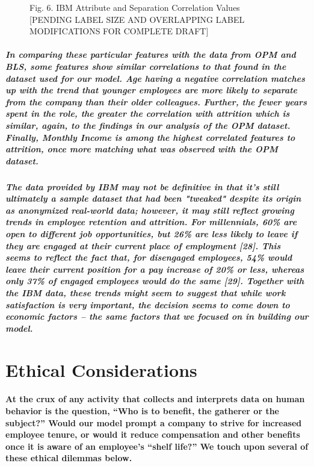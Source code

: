 \documentclass{article}
\begin{document}
\begin{figure}
\caption{Fig. 6. IBM Attribute and Separation Correlation Values [PENDING LABEL SIZE AND OVERLAPPING LABEL MODIFICATIONS FOR COMPLETE DRAFT]}
\end{figure}
 
\subparagraph{In comparing these particular features with the data from OPM and BLS, some features show similar correlations to that found in the dataset used for our model. Age having a negative correlation matches up with the trend that younger employees are more likely to separate from the company than their older colleagues. Further, the fewer years spent in the role, the greater the correlation with attrition which is similar, again, to the findings in our analysis of the OPM dataset. Finally, Monthly Income is among the highest correlated features to attrition, once more matching what was observed with the OPM dataset.}
 
\subparagraph{The data provided by IBM may not be definitive in that it's still ultimately a sample dataset that had been "tweaked" despite its origin as anonymized real-world data; however, it may still reflect growing trends in employee retention and attrition. For millennials, 60\% are open to different job opportunities, but 26\% are less likely to leave if they are engaged at their current place of employment [28]. This seems to reflect the fact that, for disengaged employees, 54\% would leave their current position for a pay increase of 20\% or less, whereas only 37\% of engaged employees would do the same [29]. Together with the IBM data, these trends might seem to suggest that while work satisfaction is very important, the decision seems to come down to economic factors – the same factors that we focused on in building our model.}
 
\section{Ethical Considerations}

\paragraph{At the crux of any activity that collects and interprets data on human behavior is the question, “Who is to benefit, the gatherer or the subject?” Would our model prompt a company to strive for increased employee tenure, or would it reduce compensation and other benefits once it is aware of an employee’s “shelf life?” We touch upon several of these ethical dilemmas below.}
 
\end{document}
